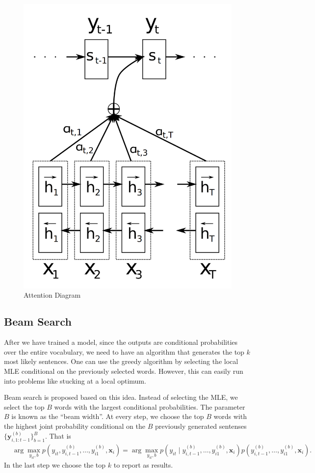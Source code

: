 \documentclass[12pt]{article}
\begin{document}
\begin{figure}
	\centering
	\includegraphics[width=0.3\linewidth]{figs/attn_diagram}
	\caption{Attention Diagram}
	\label{attn_diagram}
\end{figure}


\subsection{Beam Search}
\label{sub:beam}
After we have trained a model, since the outputs are conditional probabilities over the entire vocabulary, we need to have an algorithm that generates the top $k$ most likely sentences. One can use the greedy algorithm by selecting the local MLE conditional on the previously selected words. However, this can easily run into problems like stucking at a local optimum.

Beam search is proposed based on this idea. Instead of selecting the MLE, we select the top $B$ words with the largest conditional probabilities. The parameter $B$ is known as the ``beam width''. At every step, we choose the top $B$ words with the highest joint probability conditional on the $B$ previously generated sentenses $\{\bm y_{i, 1:t-1}^{(b)}\}_{b=1}^B$. That is
\begin{align}
	&\arg \max_{y_{it}, b} p(y_{it}, y_{i,t-1}^{(b)}, \dots, y_{i1}^{(b)}, \bm x_i)\nonumber = \arg \max_{y_{it}, b} p(y_{it} \mid y_{i,t-1}^{(b)}, \dots, y_{i1}^{(b)}, \bm x_i) p(y_{i,t-1}^{(b)}, \dots, y_{i1}^{(b)}, \bm x_i).
\end{align}
In the last step we choose the top $k$ to report as results.
\end{document}
